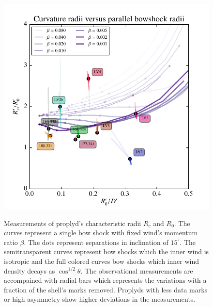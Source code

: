 \begin{figure}
\includegraphics[width=\linewidth]{../../read-shapes/proplyd-shell-R0-Rc-cloud} 
\label{fig:prop-shell-rad}
\caption{Measurements of proplyd's characteristic radii $R_c$ and $R_0$. The curves represent a single bow shock with  fixed wind's momentum ratio $\beta$. 
The dots represent separations in inclination of $15^{\circ}$. The semitransparent curves represent bow shocks which the inner wind is isotropic and the full colored 
curves bow shocks which inner wind density decays as $\cos^{1/2}\theta$. The observational measurements are accompained with radial bars which represents the variations 
with a fraction of the shell's marks removed. Proplyds with less data marks or high asymmetry show higher deviations in the measurements.
}
\end{figure}


